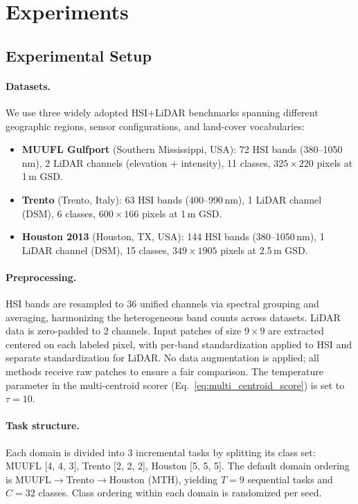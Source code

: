 \section{Experiments}
\label{sec:experiments}

\subsection{Experimental Setup}
\label{sec:setup}

\paragraph{Datasets.}
We use three widely adopted HSI+LiDAR benchmarks spanning different geographic regions, sensor configurations, and land-cover vocabularies:
\begin{itemize}
    \item \textbf{MUUFL Gulfport} (Southern Mississippi, USA): 72 HSI bands (380--1050\,nm), 2 LiDAR channels (elevation + intensity), 11 classes, $325 \times 220$ pixels at 1\,m GSD.
    \item \textbf{Trento} (Trento, Italy): 63 HSI bands (400--990\,nm), 1 LiDAR channel (DSM), 6 classes, $600 \times 166$ pixels at 1\,m GSD.
    \item \textbf{Houston 2013} (Houston, TX, USA): 144 HSI bands (380--1050\,nm), 1 LiDAR channel (DSM), 15 classes, $349 \times 1905$ pixels at 2.5\,m GSD.
\end{itemize}

\paragraph{Preprocessing.}
HSI bands are resampled to 36 unified channels via spectral grouping and averaging, harmonizing the heterogeneous band counts across datasets.
LiDAR data is zero-padded to 2 channels.
Input patches of size $9{\times}9$ are extracted centered on each labeled pixel, with per-band standardization applied to HSI and separate standardization for LiDAR.
No data augmentation is applied; all methods receive raw patches to ensure a fair comparison.
The temperature parameter in the multi-centroid scorer (Eq.~\ref{eq:multi_centroid_score}) is set to $\tau{=}10$.

\paragraph{Task structure.}
Each domain is divided into 3 incremental tasks by splitting its class set:
MUUFL [4, 4, 3], Trento [2, 2, 2], Houston [5, 5, 5].
The default domain ordering is MUUFL$\to$Trento$\to$Houston (MTH), yielding $T{=}9$ sequential tasks and $C{=}32$ classes.
Class ordering within each domain is randomized per seed.

